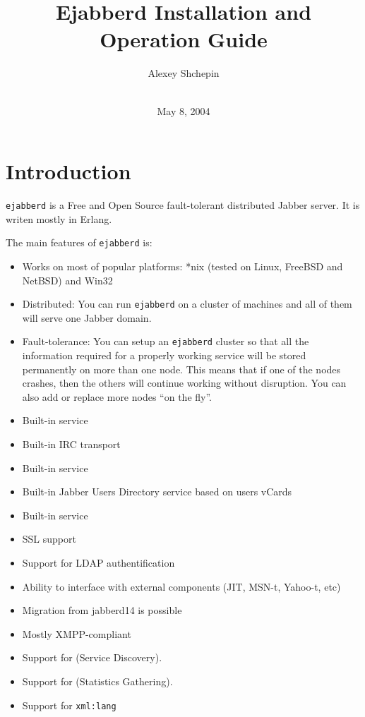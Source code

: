 \documentclass[10pt]{article}
\title{Ejabberd Installation and Operation Guide}
\author{Alexey Shchepin \\
  \ahrefurl{mailto:alexey@sevcom.net} \\
  \ahrefurl{xmpp:aleksey@jabber.ru}}
\date{May 8, 2004}
\newcommand{\logoscale}{0.7}
\newcommand{\insscaleimg}[2]{
  \imgsrc{#2}{}
  \begin{latexonly}
    \scalebox{#1}{\texttt{[image: \#2]}}
  \end{latexonly}
}
\newcommand{\ns}[1]{\texttt{#1}}
\newcommand{\ejabberd}{\texttt{ejabberd}}
\newcommand{\Jabber}{Jabber}
\begin{document}
\begin{titlepage}
  \maketitle{}
  
  {\centering
    \insscaleimg{\logoscale}{logo.png}
    \par
  }
\end{titlepage}
\tableofcontents{}

\newpage
\section{Introduction}
\label{sec:intro}

\ejabberd{} is a Free and Open Source fault-tolerant distributed \Jabber{}
server.  It is writen mostly in Erlang.

The main features of \ejabberd{} is:
\begin{itemize}
\item Works on most of popular platforms: *nix (tested on Linux, FreeBSD and
  NetBSD) and Win32
\item Distributed: You can run \ejabberd{} on a cluster of machines and all of
  them will serve one Jabber domain.
\item Fault-tolerance: You can setup an \ejabberd{} cluster so that all the
  information required for a properly working service will be stored
  permanently on more than one node.  This means that if one of the nodes
  crashes, then the others will continue working without disruption.
  You can also add or replace more nodes ``on the fly''.
\item Built-in  service
\item Built-in IRC transport
\item Built-in
  service
\item Built-in Jabber Users Directory service based on users vCards
\item Built-in
  service
\item SSL support
\item Support for LDAP authentification
\item Ability to interface with external components (JIT, MSN-t, Yahoo-t, etc)
\item Migration from jabberd14 is possible
\item Mostly XMPP-compliant
\item Support for
  (Service Discovery).
\item Support for
  (Statistics Gathering).
\item Support for \ns{xml:lang}
\end{itemize}
\end{document}
